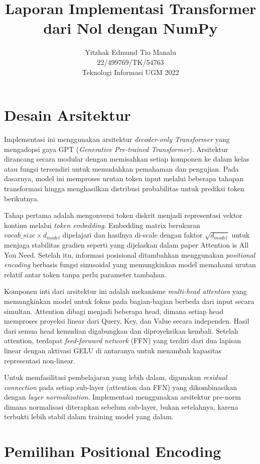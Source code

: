 \documentclass[11pt,a4paper]{article}
\title{\textbf{Laporan Implementasi Transformer dari Nol dengan NumPy}}
\author{
    Yitzhak Edmund Tio Manalu \\
    22/499769/TK/54763 \\
    Teknologi Informasi UGM 2022
}
\date{}
\begin{document}
\maketitle

\section{Desain Arsitektur}

Implementasi ini menggunakan arsitektur \textit{decoder-only Transformer} yang mengadopsi gaya GPT (\textit{Generative Pre-trained Transformer}). Arsitektur dirancang secara modular dengan memisahkan setiap komponen ke dalam kelas atau fungsi tersendiri untuk memudahkan pemahaman dan pengujian. Pada dasarnya, model ini memproses urutan token input melalui beberapa tahapan transformasi hingga menghasilkan distribusi probabilitas untuk prediksi token berikutnya.

Tahap pertama adalah mengonversi token diskrit menjadi representasi vektor kontinu melalui \textit{token embedding}. Embedding matrix berukuran $vocab\_size \times d_{model}$ dipelajari dan hasilnya di-scale dengan faktor $\sqrt{d_{model}}$ untuk menjaga stabilitas gradien seperti yang dijelaskan dalam paper Attention is All You Need. Setelah itu, informasi posisional ditambahkan menggunakan \textit{positional encoding} berbasis fungsi sinusoidal yang memungkinkan model memahami urutan relatif antar token tanpa perlu parameter tambahan.

Komponen inti dari arsitektur ini adalah mekanisme \textit{multi-head attention} yang memungkinkan model untuk fokus pada bagian-bagian berbeda dari input secara simultan. Attention dibagi menjadi beberapa head, dimana setiap head memproses proyeksi linear dari Query, Key, dan Value secara independen. Hasil dari semua head kemudian digabungkan dan diproyeksikan kembali. Setelah attention, terdapat \textit{feed-forward network} (FFN) yang terdiri dari dua lapisan linear dengan aktivasi GELU di antaranya untuk menambah kapasitas representasi non-linear.

Untuk memfasilitasi pembelajaran yang lebih dalam, digunakan \textit{residual connection} pada setiap sub-layer (attention dan FFN) yang dikombinasikan dengan \textit{layer normalization}. Implementasi menggunakan arsitektur pre-norm dimana normalisasi diterapkan sebelum sub-layer, bukan setelahnya, karena terbukti lebih stabil dalam training model yang dalam.

\section{Pemilihan Positional Encoding}
\end{document}
